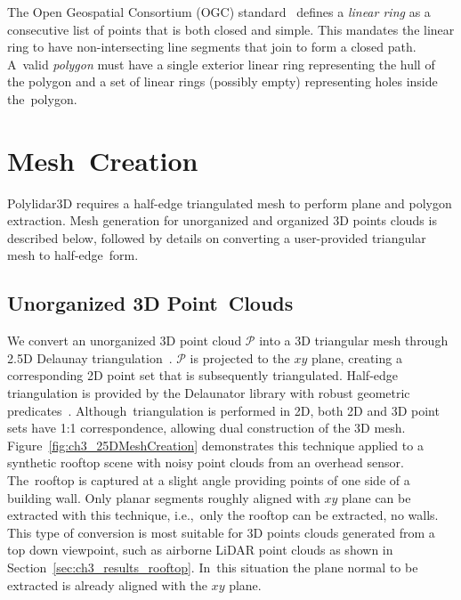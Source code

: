 
The Open Geospatial Consortium (OGC) standard~\cite{herring_opengis_2006-1} defines a \textit{linear ring} as a consecutive list of points that is both closed and simple. This mandates the linear ring to have non-intersecting line segments that join to form a closed path. A~valid \textit{polygon} must have a single exterior linear ring representing the hull of the polygon and a set of linear rings (possibly empty) representing holes inside the~polygon. 


\section{Mesh~Creation}\label{sec:ch3_methods_mesh_creation}

Polylidar3D requires a half-edge triangulated mesh to perform plane and polygon extraction. Mesh generation for unorganized and organized 3D points clouds is described below, followed by details on converting a user-provided triangular mesh to half-edge~form.

\subsection{Unorganized 3D Point~Clouds}\label{sec:ch3_methods_mesh_upc}

We convert an unorganized 3D point cloud $\mathcal{P}$ into a 3D triangular mesh through 2.5D Delaunay triangulation~\cite{de_berg_delaunay_2008}. $\mathcal{P}$ is projected to the $xy$ plane, creating a corresponding 2D point set that is subsequently triangulated.  Half-edge triangulation is provided by the Delaunator library with robust geometric predicates~\cite{noauthor_github_2018, richard_shewchuk_adaptive_1997}. Although~triangulation is performed in 2D, both 2D and 3D point sets have 1:1 correspondence, allowing dual construction of the 3D mesh. Figure~\ref{fig:ch3_25DMeshCreation} demonstrates this technique applied to a synthetic rooftop scene with noisy point clouds from an overhead sensor. The~rooftop is captured at a slight angle providing points of one side of a building wall.  Only planar segments roughly aligned with $xy$ plane can be extracted with this technique, i.e.,~only the rooftop can be extracted, no walls. This type of conversion is most suitable for 3D points clouds generated from a top down viewpoint, such as airborne LiDAR point clouds as shown in Section~\ref{sec:ch3_results_rooftop}. In~this situation the plane normal to be extracted is already aligned with the $xy$ plane. 

